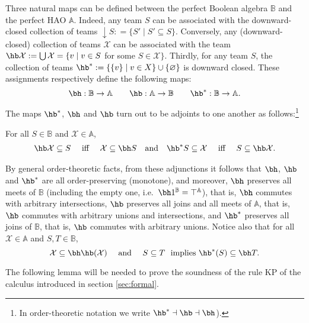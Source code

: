 Three natural maps can be defined between the perfect Boolean algebra $\mathbb{B}$ and the perfect HAO $\mathbb{A}$. Indeed, any team $S$ can be associated with the downward-closed collection of teams ${\downarrow}S: = \{S'\mid S'\subseteq S\}$. Conversely, any (downward-closed) collection of teams $\mathcal{X}$ can be associated with the team $\hb\mathcal{X} := \bigcup\mathcal{X} = \{v\mid v\in S$  for some $S\in \mathcal{X}\}.$ Thirdly, for any team $S$, the collection of teams  $\hb^\ast: = \{\{v\}\mid v\in X\}\cup\{\varnothing\}$ is downward closed. These assignments respectively define the following maps:
\[\bh: \mathbb{B}\to \mathbb{A}\quad\quad \hb: \mathbb{A}\to \mathbb{B}\quad \quad \hb^{\ast}: \mathbb{B}\to \mathbb{A}.\]

The maps $\hb^{\ast}$, $\bh$ and $\hb$ turn out to be adjoints to one another as follows:\footnote{In order-theoretic notation we write  $\hb^{\ast}\dashv \hb\dashv \bh$).}

\begin{lemma}
\label{lemma: bh left adjoint of hb}
For all $S\in \mathbb{B}$ and $\mathcal{X}\in \mathbb{A}$,
\begin{align}
\hb \mathcal{X}\subseteq S \quad \mbox{ iff }\quad \mathcal{X}\subseteq \bh S && \text{and} &&
\hb^{\ast}S\subseteq \mathcal{X} \quad \mbox{ iff }\quad S\subseteq \hb\mathcal{X}.
\end{align}
\end{lemma}
By general order-theoretic facts, from these adjunctions it follows that $\bh$, $\hb$ and $\hb^*$ are all order-preserving (monotone), and moreover, $\bh$ preserves all meets of $\mathbb{B}$ (including the empty one, i.e.\ $\bh 1^{\mathbb{B}} = \top^{\mathbb{A}}$), that is, $\bh$ commutes with arbitrary intersections, $\hb$ preserves all joins and all meets of $\mathbb{A}$, that is, $\hb$ commutes with arbitrary unions and intersections, and $\hb^*$ preserves all joins  of $\mathbb{B}$, that is, $\hb$ commutes with arbitrary unions.
Notice also that  for all $\mathcal{X}\in \mathbb{A}$ and $S, T\in \mathbb{B}$,
\begin{equation}
\label{eq:soundness of rules}
\mathcal{X}\subseteq \bh \hb(\mathcal{X})\quad \mbox{ and }\quad S\subseteq T \ \mbox{ implies } \hb^*(S)\subseteq \bh T.
\end{equation}

The following lemma  will be needed to prove the soundness of the rule KP of the calculus introduced in section \ref{sec:formal}.

